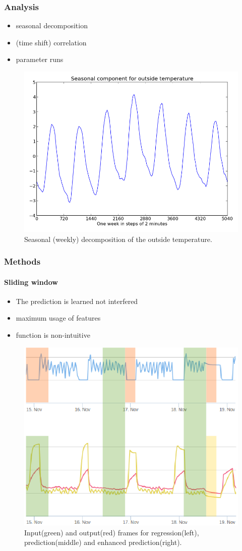 \documentclass{beamer}
\begin{document}
\begin{frame}
\frametitle{Analysis}

\begin{itemize}
\item seasonal decomposition
\item (time shift) correlation 
\item parameter runs
\end{itemize}

\begin{figure}[H]
  \includegraphics[width=0.6\linewidth]{img/season-outside_temperature.png}
  \caption{Seasonal (weekly) decomposition of the outside temperature.}
  \label{fig:correlation}
\end{figure}
\end{frame}

\begin{frame}
\frametitle{Methods}
\framesubtitle{Sliding window}

\begin{itemize}
\item The prediction is learned not interfered
\item maximum usage of features
\item function is non-intuitive
\end{itemize}

\begin{figure}[H]
  \center
  \includegraphics[width=0.4\linewidth]{img/regpred.png}
  \caption{Input(green) and output(red) frames for regression(left), prediction(middle) and enhanced prediction(right).}
  \label{fig:correlation}
\end{figure}
\end{frame}
\end{document}
